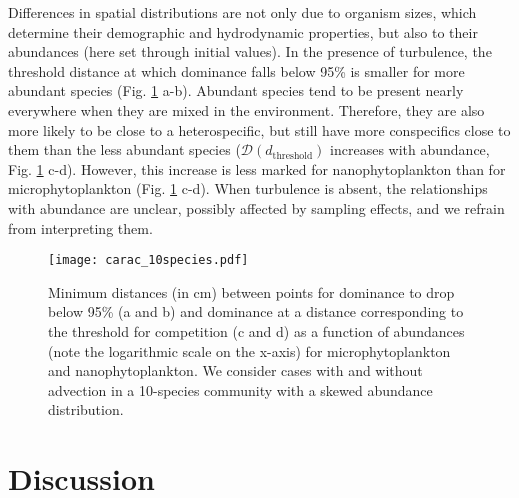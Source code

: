 \documentclass[12pt,english]{article}
\begin{document}
Differences in spatial distributions are not only due to organism
sizes, which determine their demographic and hydrodynamic properties,
but also to their abundances (here set through initial values). In
the presence of turbulence, the threshold distance at which dominance
falls below 95\% is smaller for more abundant species (Fig. \ref{fig:Carac_10sp}
a-b). Abundant species tend to be present nearly everywhere when they
are mixed in the environment. Therefore, they are also more likely
to be close to a heterospecific, but still have more conspecifics
close to them than the less abundant species ($\mathcal{D}\left(d_{\text{threshold}}\right)$
increases with abundance, Fig. \ref{fig:Carac_10sp} c-d). However,
this increase is less marked for nanophytoplankton than for microphytoplankton
(Fig. \ref{fig:Carac_10sp} c-d). When turbulence is absent, the relationships
with abundance are unclear, possibly affected by sampling effects,
and we refrain from interpreting them.

\begin{figure}[H]
\begin{centering}
\texttt{[image: carac\_10species.pdf]} 
\par\end{centering}
\caption{Minimum distances (in cm) between points for dominance to drop below
95\% (a and b) and dominance at a distance corresponding to the threshold
for competition (c and d) as a function of abundances (note the logarithmic
scale on the x-axis) for microphytoplankton and nanophytoplankton.
We consider cases with and without advection in a 10-species community
with a skewed abundance distribution. \label{fig:Carac_10sp}}
\end{figure}


\section*{Discussion}
\end{document}

